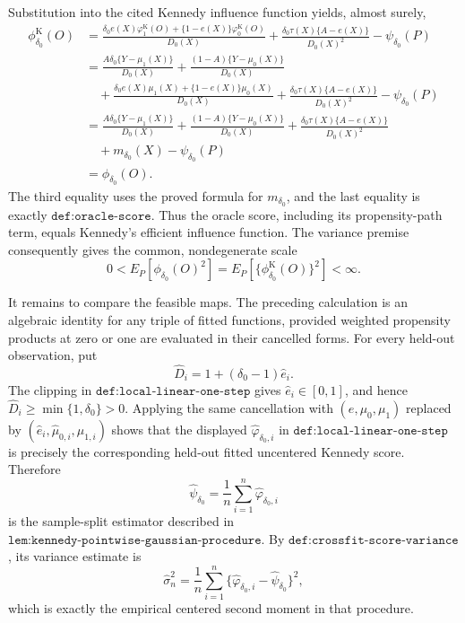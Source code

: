 Substitution into the cited Kennedy influence function yields, almost
surely,
\[
\begin{aligned}
\phi_{\delta_0}^{\mathrm K}(O)
&=\frac{\delta_0e(X)\varphi_1^{\mathrm K}(O)
       +\{1-e(X)\}\varphi_0^{\mathrm K}(O)}{D_0(X)}
  +\frac{\delta_0\tau(X)\{A-e(X)\}}{D_0(X)^2}
  -\psi_{\delta_0}(P)\\
&=\frac{A\delta_0\{Y-\mu_1(X)\}}{D_0(X)}
  +\frac{(1-A)\{Y-\mu_0(X)\}}{D_0(X)}\\
&\quad
  +\frac{\delta_0e(X)\mu_1(X)+\{1-e(X)\}\mu_0(X)}{D_0(X)}
  +\frac{\delta_0\tau(X)\{A-e(X)\}}{D_0(X)^2}
  -\psi_{\delta_0}(P)\\
&=\frac{A\delta_0\{Y-\mu_1(X)\}}{D_0(X)}
  +\frac{(1-A)\{Y-\mu_0(X)\}}{D_0(X)}
  +\frac{\delta_0\tau(X)\{A-e(X)\}}{D_0(X)^2}\\
&\quad +m_{\delta_0}(X)-\psi_{\delta_0}(P)\\
&=\phi_{\delta_0}(O).
\end{aligned}
\]
The third equality uses the proved formula for \(m_{\delta_0}\), and the
last equality is exactly \(\texttt{def:oracle-score}\).  Thus the oracle
score, including its propensity-path term, equals Kennedy's efficient
influence function.  The variance premise consequently gives the common,
nondegenerate scale
\[
0<E_P\!\left[\phi_{\delta_0}(O)^2\right]
=E_P\!\left[\{\phi_{\delta_0}^{\mathrm K}(O)\}^2\right]<\infty.
\]

It remains to compare the feasible maps.  The preceding calculation is
an algebraic identity for any triple of fitted functions, provided
weighted propensity products at zero or one are evaluated in their
cancelled forms.  For every held-out observation, put
\[
\widehat D_i=1+(\delta_0-1)\widehat e_i.
\]
The clipping in \(\texttt{def:local-linear-one-step}\) gives
\(\widehat e_i\in[0,1]\), and hence
\(\widehat D_i\geq\min\{1,\delta_0\}>0\).  Applying the same cancellation
with \((e,\mu_0,\mu_1)\) replaced by
\((\widehat e_i,\widehat\mu_{0,i},\widehat\mu_{1,i})\) shows that the
displayed \(\widehat\varphi_{\delta_0,i}\) in
\(\texttt{def:local-linear-one-step}\) is precisely the corresponding
held-out fitted uncentered Kennedy score.  Therefore
\[
\widehat\psi_{\delta_0}
=\frac1n\sum_{i=1}^n\widehat\varphi_{\delta_0,i}
\]
is the sample-split estimator described in
\(\texttt{lem:kennedy-pointwise-gaussian-procedure}\).  By
\(\texttt{def:crossfit-score-variance}\), its variance estimate is
\[
\widehat\sigma_n^2
=\frac1n\sum_{i=1}^n
 \{\widehat\varphi_{\delta_0,i}-\widehat\psi_{\delta_0}\}^2,
\]
which is exactly the empirical centered second moment in that procedure.

